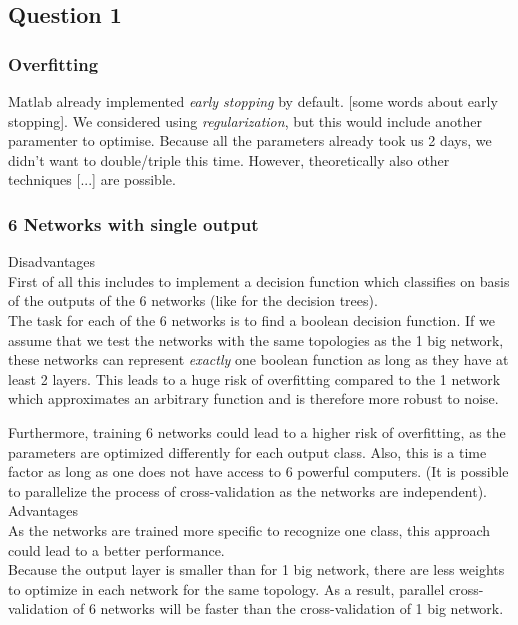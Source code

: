 \documentclass{article}
\begin{document}
\subsection{Question 1}

\subsubsection{Overfitting}
Matlab already implemented \emph{early stopping} by default. [some words about early stopping]. We considered using \emph{regularization}, but this would include another paramenter to optimise. Because all the parameters already took us 2 days, we didn't want to double/triple this time. However, theoretically also other techniques [...] are possible.

\subsubsection{6 Networks with single output}
Disadvantages\\
First of all this includes to implement a decision function which classifies on basis of the outputs of the 6 networks (like for the decision trees).\\
The task for each of the 6 networks is to find a boolean decision function. If we assume that we test the networks with the same topologies as the 1 big network, these networks can represent \textit{exactly} one boolean function as long as they have at least 2 layers. This leads to a huge risk of overfitting compared to the 1 network which approximates an arbitrary function and is therefore more robust to noise.

Furthermore, training 6 networks could lead to a higher risk of overfitting, as the parameters are optimized differently for each output class. Also, this is a time factor as long as one does not have access to 6 powerful computers. (It is possible to parallelize the process of cross-validation as the networks are independent).
\\
Advantages\\
As the networks are trained more specific to recognize one class, this approach could lead to a better performance.\\
Because the output layer is smaller than for 1 big network, there are less weights to optimize in each network for the same topology. As a result, parallel cross-validation of 6 networks will be faster than the cross-validation of 1 big network.
\end{document}
